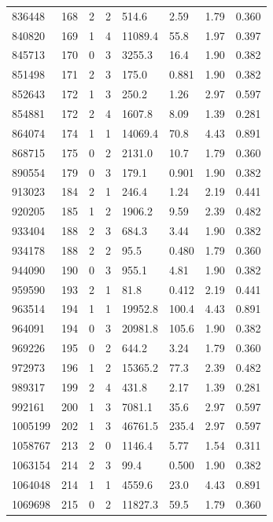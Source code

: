 \documentclass[preview]{standalone}
\begin{document}
{{{\begin{tabular}{L{1.2cm}C{1.2cm} C{0.3cm}C{0.5cm} C{1.4cm}C{1.4cm} C{1.4cm}C{1.4cm}}
  836448  &   168  & 2     &  2 &  514.6  & 2.59  & 1.79 &  0.360   \\ 
  840820  &   169  & 1     &  4 &  11089.4  & 55.8  & 1.97 &  0.397   \\ 
  845713  &   170  & 0     &  3 &  3255.3  & 16.4  & 1.90 &  0.382   \\ 
  851498  &   171  & 2     &  3 &  175.0  & 0.881  & 1.90 &  0.382   \\ 
  852643  &   172  & 1     &  3 &  250.2  & 1.26  & 2.97 &  0.597   \\ 
  854881  &   172  & 2     &  4 &  1607.8  & 8.09  & 1.39 &  0.281   \\ 
  864074  &   174  & 1     &  1 &  14069.4  & 70.8  & 4.43 &  0.891   \\ 
  868715  &   175  & 0     &  2 &  2131.0  & 10.7  & 1.79 &  0.360   \\ 
  890554  &   179  & 0     &  3 &  179.1  & 0.901  & 1.90 &  0.382   \\ 
  913023  &   184  & 2     &  1 &  246.4  & 1.24  & 2.19 &  0.441   \\ 
  920205  &   185  & 1     &  2 &  1906.2  & 9.59  & 2.39 &  0.482   \\ 
  933404  &   188  & 2     &  3 &  684.3  & 3.44  & 1.90 &  0.382   \\ 
  934178  &   188  & 2     &  2 &  95.5  & 0.480  & 1.79 &  0.360   \\ 
  944090  &   190  & 0     &  3 &  955.1  & 4.81  & 1.90 &  0.382   \\ 
  959590  &   193  & 2     &  1 &  81.8  & 0.412  & 2.19 &  0.441   \\ 
  963514  &   194  & 1     &  1 &  19952.8  & 100.4  & 4.43 &  0.891   \\ 
  964091  &   194  & 0     &  3 &  20981.8  & 105.6  & 1.90 &  0.382   \\ 
  969226  &   195  & 0     &  2 &  644.2  & 3.24  & 1.79 &  0.360   \\ 
  972973  &   196  & 1     &  2 &  15365.2  & 77.3  & 2.39 &  0.482   \\ 
  989317  &   199  & 2     &  4 &  431.8  & 2.17  & 1.39 &  0.281   \\ 
  992161  &   200  & 1     &  3 &  7081.1  & 35.6  & 2.97 &  0.597   \\ 
  1005199  &   202  & 1     &  3 &  46761.5  & 235.4  & 2.97 &  0.597   \\ 
  1058767  &   213  & 2     &  0 &  1146.4  & 5.77  & 1.54 &  0.311   \\ 
  1063154  &   214  & 2     &  3 &  99.4  & 0.500  & 1.90 &  0.382   \\ 
  1064048  &   214  & 1     &  1 &  4559.6  & 23.0  & 4.43 &  0.891   \\ 
  1069698  &   215  & 0     &  2 &  11827.3  & 59.5  & 1.79 &  0.360   \\ 
\hline 
\end{tabular} 

}}}
\end{document}

